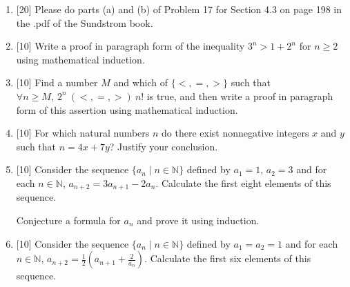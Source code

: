 \documentclass[12pt]{article}
\newcommand{\NN}{{\mathbb N}}
\begin{document}
  
\begin{enumerate}


\item{[20]} Please do parts (a) and (b) of Problem 17 for Section 4.3 on page 198 in the .pdf of the Sundstrom book.

\item{[10]} Write a proof in paragraph form of the inequality
$3^n > 1+2^n$  for $n\geq 2$ using mathematical induction.

 
\item{[10]}  Find a number $M$ and which of $\{<, =,>\}$ such that
  $\forall n\geq M, \ 2^n\ (<, =,>)\ n!$ is true, and then write a proof in paragraph form of this assertion
  using mathematical induction.
  

\item{[10]} For which natural numbers $n$ do there exist nonnegative integers $x$ and $y$ such that $n=4x+7y$?
   Justify your conclusion.

 \item{[10]} Consider the sequence $\{a_n\mid n\in\NN\}$  defined by $a_1=1$, $a_2=3$ and for each $n\in \NN$,
           $a_{n+2}=3 a_{n+1}-2a_n$.
   Calculate the first eight elements of this sequence. 

   Conjecture a formula for $a_n$ and prove it using induction.

 \item{[10]} Consider the sequence $\{a_n\mid n\in\NN\}$  defined by $a_1=a_2=1$ and for each $n\in \NN$,
           $a_{n+2}=\frac{1}{2}\left(a_{n+1}+\frac{2}{a_n}\right)$.
   Calculate the first six elements of this sequence.


\end{enumerate}
\end{document}
